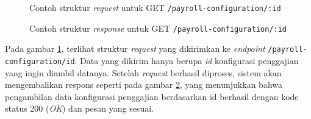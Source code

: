 \begin{figure}
    \centering
    \caption{Contoh struktur \textit{request} untuk GET \texttt{/payroll-configuration/{:id}}}
    \label{fig:request_payroll_configuration_by_id_get}
\end{figure}
\begin{figure}
    \centering
    \caption{Contoh struktur \textit{response} untuk GET \texttt{/payroll-configuration/{:id}}}
    \label{fig:response_payroll_configuration_by_id_get}
\end{figure}
Pada gambar \ref{fig:request_payroll_configuration_by_id_get}, terlihat struktur \textit{request} yang dikirimkan ke \textit{endpoint} \texttt{/payroll-configuration/{id}}. Data yang dikirim hanya berupa \textit{id} konfigurasi penggajian yang ingin diambil datanya. Setelah \textit{request} berhasil diproses, sistem akan mengembalikan respons seperti pada gambar \ref{fig:response_payroll_configuration_by_id_get}, yang menunjukkan bahwa pengambilan data konfigurasi penggajian berdasarkan id berhasil dengan kode status 200 (\textit{OK}) dan pesan yang sesuai.


